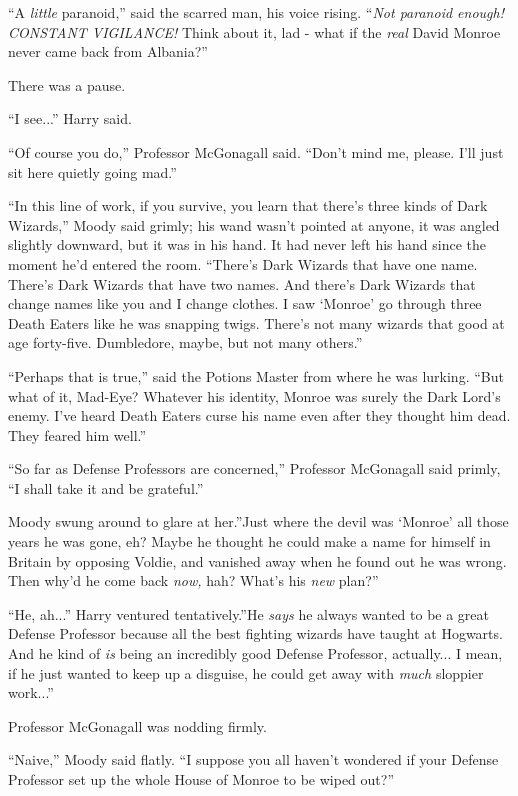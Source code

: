 ``A \emph{little} paranoid,'' said the scarred man, his voice rising.
``\emph{Not paranoid enough! CONSTANT VIGILANCE!} Think about it, lad -
what if the \emph{real} David Monroe never came back from Albania?''

There was a pause.

``I see...'' Harry said.

``Of course you do,'' Professor McGonagall said. ``Don't mind me,
please. I'll just sit here quietly going mad.''

``In this line of work, if you survive, you learn that there's three
kinds of Dark Wizards,'' Moody said grimly; his wand wasn't pointed at
anyone, it was angled slightly downward, but it was in his hand. It had
never left his hand since the moment he'd entered the room. ``There's
Dark Wizards that have one name. There's Dark Wizards that have two
names. And there's Dark Wizards that change names like you and I change
clothes. I saw `Monroe' go through three Death Eaters like he was
snapping twigs. There's not many wizards that good at age forty-five.
Dumbledore, maybe, but not many others.''

``Perhaps that is true,'' said the Potions Master from where he was
lurking. ``But what of it, Mad-Eye? Whatever his identity, Monroe was
surely the Dark Lord's enemy. I've heard Death Eaters curse his name
even after they thought him dead. They feared him well.''

``So far as Defense Professors are concerned,'' Professor McGonagall
said primly, ``I shall take it and be grateful.''

Moody swung around to glare at her.''Just where the devil was `Monroe'
all those years he was gone, eh? Maybe he thought he could make a name
for himself in Britain by opposing Voldie, and vanished away when he
found out he was wrong. Then why'd he come back \emph{now,} hah? What's
his \emph{new} plan?''

``He, ah...'' Harry ventured tentatively.''He \emph{says} he always
wanted to be a great Defense Professor because all the best fighting
wizards have taught at Hogwarts. And he kind of \emph{is} being an
incredibly good Defense Professor, actually... I mean, if he just
wanted to keep up a disguise, he could get away with \emph{much}
sloppier work...''

Professor McGonagall was nodding firmly.

``Naive,'' Moody said flatly. ``I suppose you all haven't wondered if
your Defense Professor set up the whole House of Monroe to be wiped
out?''

